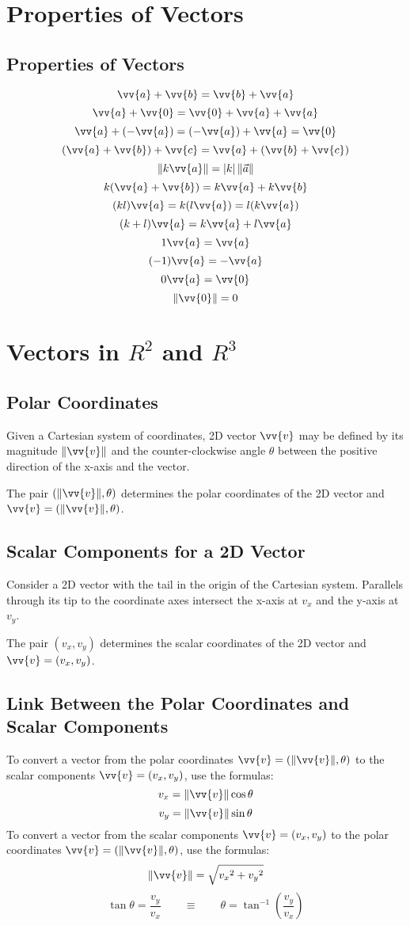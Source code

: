 	\section{Properties of Vectors}
		\subsection{Properties of Vectors}
			\[\vv{a} + \vv{b} = \vv{b} + \vv{a}\]
			\[\vv{a} + \vv{0} = \vv{0} + \vv{a} + \vv{a}\]
			\[\vv{a} + (-\vv{a}) = (-\vv{a}) + \vv{a} = \vv{0}\]
			\[(\vv{a} + \vv{b}) + \vv{c} = \vv{a} + (\vv{b} + \vv{c})\]
			\[\|k\vv{a}\| = |k|\,\|\vec{a}\|\]
			\[k(\vv{a}+\vv{b}) = k\vv{a} + k\vv{b}\]
			\[(kl)\vv{a} = k(l\vv{a}) = l(k\vv{a})\]
			\[(k + l)\vv{a} = k\vv{a} + l\vv{a}\]
			\[1\vv{a} = \vv{a}\]
			\[(-1)\vv{a} = -\vv{a}\]
			\[0\vv{a} = \vv{0}\]
			\[\|\vv{0}\| = 0\]
	\section{Vectors in $R^2$ and $R^3$}
		\subsection{Polar Coordinates}
			Given a Cartesian system of coordinates, 2D vector $\vv{v}$ may be defined by its magnitude $\|\vv{v}\|$ and the counter-clockwise angle $\theta$ between the positive direction of the x-axis and the vector.

			The pair $(\|\vv{v}\|, \theta)$ determines the polar coordinates of the 2D vector and $\vv{v} = (\|\vv{v}\|, \theta)$.
		\subsection{Scalar Components for a 2D Vector}
			Consider a 2D vector with the tail in the origin of the Cartesian system. Parallels through its tip to the coordinate axes intersect the x-axis at $v_x$ and the y-axis at $v_y$.

			The pair $(v_x, v_y)$ determines the scalar coordinates of the 2D vector and $\vv{v} = (v_x, v_y)$.
		\subsection{Link Between the Polar Coordinates and Scalar Components}
			To convert a vector from the polar coordinates $\vv{v} = (\|\vv{v}\|, \theta)$ to the scalar components $\vv{v}=(v_x, v_y)$, use the formulas:
			\[v_x = \|\vv{v}\|\cos\theta\]
			\[v_y = \|\vv{v}\|\sin\theta\]
			To convert a vector from the scalar components $\vv{v}=(v_x, v_y)$ to the polar coordinates $\vv{v}=(\|\vv{v}\|, \theta)$, use the formulas:
			\[\|\vv{v}\| = \sqrt{{v_x}^2 + {v_y}^2}\]
			\[\tan\theta = \frac{v_y}{v_x} \qquad \equiv \qquad \theta = \tan^{-1} \left(\frac{v_y}{v_x}\right)\]
